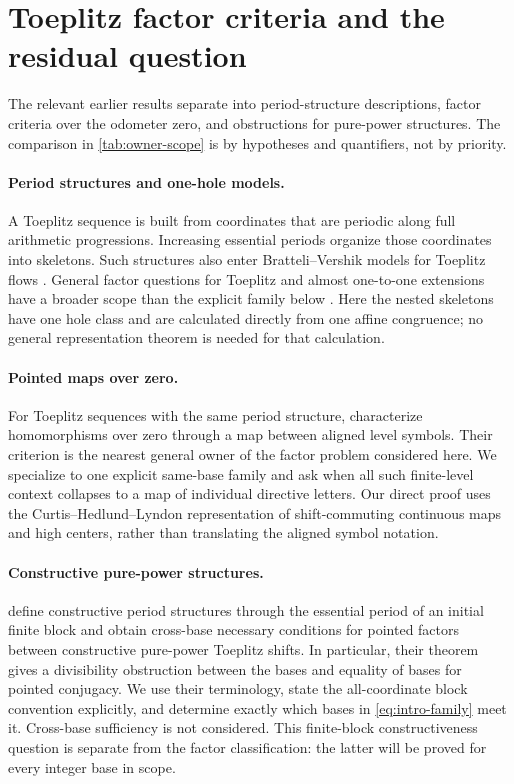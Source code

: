 \section{Toeplitz factor criteria and the residual question}
\label{sec:context}

The relevant earlier results separate into period-structure descriptions,
factor criteria over the odometer zero, and obstructions for pure-power
structures.  The comparison in \cref{tab:owner-scope} is by hypotheses and
quantifiers, not by priority.

\paragraph{Period structures and one-hole models.}
A Toeplitz sequence is built from coordinates that are periodic along full
arithmetic progressions.  Increasing essential periods organize those
coordinates into skeletons.  Such structures also enter
Bratteli--Vershik models for Toeplitz flows
\citep{GjerdeJohansen2000}.  General factor questions for Toeplitz and
almost one-to-one extensions have a broader scope than the explicit family
below \citep{DownarowiczDurand2002}.  Here the nested skeletons have one
hole class and are calculated directly from one affine congruence; no
general representation theorem is needed for that calculation.

\paragraph{Pointed maps over zero.}
For Toeplitz sequences with the same period structure,
\citet[Theorem~1]{DKL1995} characterize homomorphisms over zero through a
map between aligned level symbols.  Their criterion is the nearest general
owner of the factor problem considered here.  We specialize to one explicit
same-base family and ask when all such finite-level context collapses to a
map of individual directive letters.  Our direct proof uses the
Curtis--Hedlund--Lyndon representation of shift-commuting continuous maps
\citep{Hedlund1969} and high centers, rather than translating the aligned
symbol notation.

\paragraph{Constructive pure-power structures.}
\citet{HosseiniYassawi2026} define constructive period structures through
the essential period of an initial finite block and obtain cross-base
necessary conditions for pointed factors between constructive pure-power
Toeplitz shifts.  In particular, their theorem gives a divisibility
obstruction between the bases and equality of bases for pointed conjugacy.
We use their terminology, state the all-coordinate block convention
explicitly, and determine exactly which bases in \cref{eq:intro-family}
meet it.  Cross-base sufficiency is not considered.
This finite-block constructiveness question is separate from the factor
classification: the latter will be proved for every integer base in scope.

